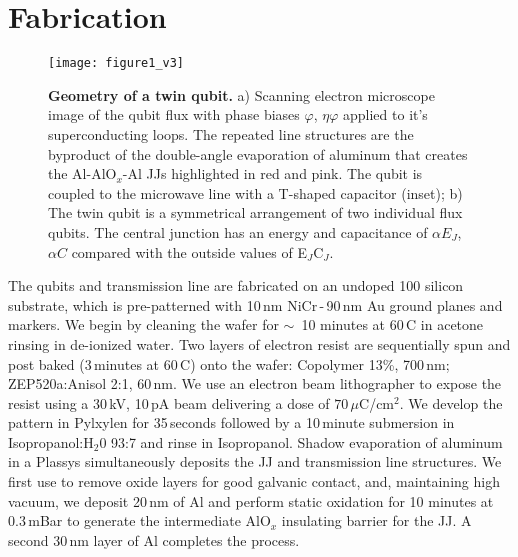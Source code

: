 \section{Fabrication}


\begin{figure}[h]
  \texttt{[image: figure1\_v3]}
  \caption{\small \textbf{Geometry of a twin qubit.}  a) Scanning electron microscope image of
    the qubit flux with phase biases $ \varphi $,  $ \eta\varphi $ applied to it's superconducting loops. The
    repeated line  structures are the  byproduct of  the double-angle evaporation  of aluminum
    that creates the  Al-AlO$_x$-Al JJs highlighted in  red and pink. The qubit  is coupled to
    the microwave line with  a T-shaped capacitor (inset); b) The twin  qubit is a symmetrical
    arrangement  of two  individual  flux qubits.   The  central junction  has  an energy  and
    capacitance of $ \alpha E_{J}$, $\alpha C$ compared with the outside values of E$_J$C$_J$.}
  \label{fig:setup}
\end{figure}

\noindent The qubits and transmission line are fabricated on an undoped 100 silicon substrate,
which is pre-patterned with  10\,nm NiCr\,-\,90\,nm Au ground planes and  markers. We begin by
cleaning the  wafer for $\sim$~10 minutes  at 60\,C in  acetone rinsing in de-ionized  water. Two
layers of electron resist are sequentially spun  and post baked (3\,minutes at 60\,C) onto the
wafer:  {Copolymer 13\%},  700\,nm;  ZEP520a:Anisol  2:1, 60\,nm.   We  use  an electron  beam
lithographer  to  expose  the  resist  using  a 30\,kV,  10\,pA  beam  delivering  a  dose  of
$ 70\,\mu $C/cm$^2$. We develop the pattern in Pylxylen for 35\,seconds followed by a 10\,minute
submersion in Isopropanol:H$_2$0 93:7 and rinse in Isopropanol. Shadow evaporation of aluminum
in a Plassys \cite{wu2013} simultaneously deposits the JJ and transmission line structures. We
first  use   to  remove  oxide  layers  for  good galvanic  contact,  and,
maintaining high vacuum, we  deposit 20\,nm of Al and perform static  oxidation for 10 minutes
at 0.3\,mBar  to generate the  intermediate AlO$_x$ insulating barrier  for the JJ.   A second
30\,nm layer of Al completes the process.

